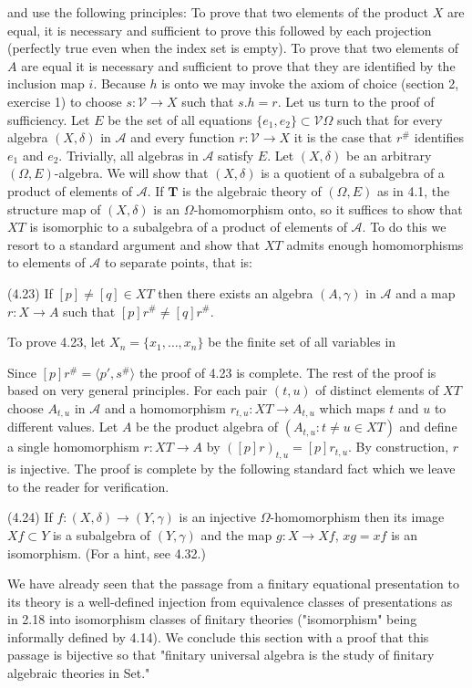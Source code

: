 and use the following principles: To prove that two elements of the product $X$ are equal, it is necessary and sufficient to prove this followed by each projection (perfectly true even when the index set is empty). To prove that two elements of $A$ are equal it is necessary and sufficient to prove that they are identified by the inclusion map $i$. Because $h$ is onto we may invoke the axiom of choice (section 2, exercise 1) to choose $s: \mathcal{V} \longrightarrow X$ such that $s.h = r$. Let us turn to the proof of sufficiency. Let $E$ be the set of all equations $\{e_1, e_2\} \subset \mathcal{V}\Omega$ such that for every algebra $(X, \delta)$ in $\mathcal{A}$ and every function $r: \mathcal{V} \longrightarrow X$ it is the case that $r^\#$ identifies $e_1$ and $e_2$. Trivially, all algebras in $\mathcal{A}$ satisfy $E$. Let $(X, \delta)$ be an arbitrary $(\Omega, E)$-algebra. We will show that $(X, \delta)$ is a quotient of a subalgebra of a product of elements of $\mathcal{A}$. If $\mathbf{T}$ is the algebraic theory of $(\Omega, E)$ as in 4.1, the structure map of $(X, \delta)$ is an $\Omega$-homomorphism onto, so it suffices to show that $XT$ is isomorphic to a subalgebra of a product of elements of $\mathcal{A}$. To do this we resort to a standard argument and show that $XT$ admits enough homomorphisms to elements of $\mathcal{A}$ to separate points, that is:

(4.23) If $[p] \neq [q] \in XT$ then there exists an algebra $(A, \gamma)$ in $\mathcal{A}$ and a map $r: X \longrightarrow A$ such that $[p]r^\# \neq [q]r^\#$.

To prove 4.23, let $X_n = \{x_1, \ldots, x_n\}$ be the finite set of all variables in

Since $[p]r^{\#} = \langle p', s^{\#} \rangle$ the proof of 4.23 is complete. The rest of the proof is based on very general principles. For each pair $(t, u)$ of distinct elements of $XT$ choose $A_{t, u}$ in $\mathcal{A}$ and a homomorphism $r_{t, u}:XT \longrightarrow A_{t, u}$ which maps $t$ and $u$ to different values. Let $A$ be the product algebra of $(A_{t, u}:t \neq u \in XT)$ and define a single homomorphism $r:XT \longrightarrow A$ by $([p]r)_{t, u} = [p]r_{t, u}$. By construction, $r$ is injective. The proof is complete by the following standard fact which we leave to the reader for verification.

(4.24) If $f:(X, \delta) \longrightarrow (Y, \gamma)$ is an injective $\Omega$-homomorphism then its image $Xf \subset Y$ is a subalgebra of $(Y, \gamma)$ and the map $g:X \longrightarrow Xf$, $xg = xf$ is an isomorphism. (For a hint, see 4.32.)

We have already seen that the passage from a finitary equational presentation to its theory is a well-defined injection from equivalence classes of presentations as in 2.18 into isomorphism classes of finitary theories ("isomorphism" being informally defined by 4.14). We conclude this section with a proof that this passage is bijective so that "finitary universal algebra is the study of finitary algebraic theories in Set."